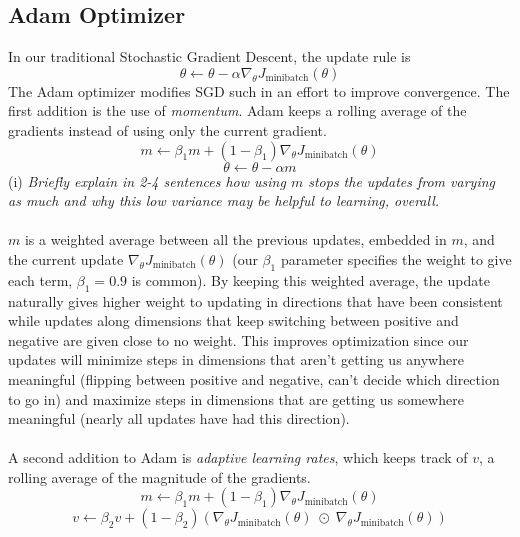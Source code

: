 \documentclass[12pt]{article}
\begin{document}
\subsection{Adam Optimizer}
In our traditional Stochastic Gradient Descent, the update rule is 
\begin{equation*}
    \theta \leftarrow \theta - \alpha \nabla_{\theta} J_{\text{minibatch}}(\theta)
\end{equation*}
The Adam optimizer modifies SGD such in an effort to improve convergence. The first 
addition is the use of \emph{momentum}. Adam keeps a rolling average of the gradients 
instead of using only the current gradient. 
\begin{equation*}
    m \leftarrow \beta_1 m + (1 - \beta_1) \nabla_\theta J_{\text{minibatch}} (\theta)
\end{equation*}
\begin{equation*}
    \theta \leftarrow \theta - \alpha m
\end{equation*}
(i) \emph{Briefly explain in 2-4 sentences how using $m$ stops the updates from 
varying as much and why this low variance may be helpful to learning, overall.}
~\\
~\\
$m$ is a weighted average between all the previous updates, embedded in $m$, and the current 
update $\nabla_\theta J_{\text{minibatch}}(\theta)$ (our $\beta_1$ parameter specifies the 
weight to give each term, $\beta_1 = 0.9$ is common). By keeping this weighted average, 
the update naturally gives higher weight to updating in directions that have been 
consistent while updates along dimensions that keep switching between positive and negative 
are given close to no weight. This improves optimization since our updates will minimize steps 
in dimensions that aren't getting us anywhere meaningful (flipping between positive and negative, 
can't decide which direction to go in) and maximize steps in dimensions that are getting us 
somewhere meaningful (nearly all updates have had this direction). 
~\\
~\\
A second addition to Adam is \emph{adaptive learning rates}, which keeps track of $v$, a rolling average
of the magnitude of the gradients. 
\begin{equation*}
    m \leftarrow \beta_1 m + (1 - \beta_1) \nabla_\theta J_{\text{minibatch}}(\theta)
\end{equation*}
\begin{equation*}
    v \leftarrow \beta_2 v + (1 - \beta_2) (\nabla_\theta J_{\text{minibatch}}(\theta) 
    \; \odot \; \nabla_\theta J_{\text{minibatch}}(\theta) )
\end{equation*}
\end{document}
